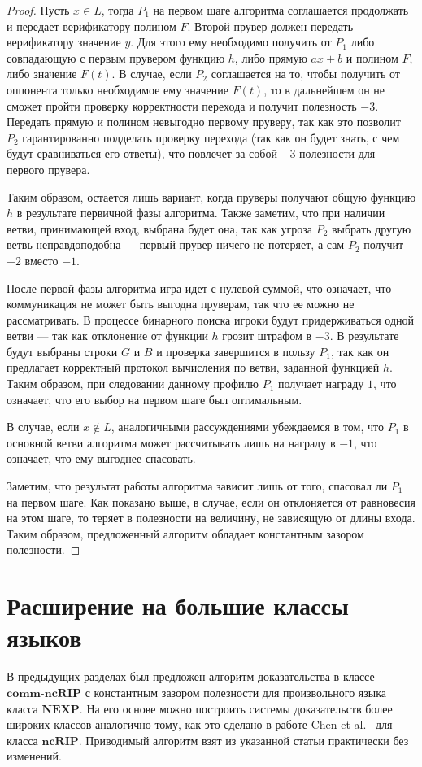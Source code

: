 \documentclass[14pt, a4paper]{extreport}
\begin{document}
\begin{proof}
        Пусть $x \in L$, тогда $P_1$ на первом шаге алгоритма соглашается продолжать и передает верификатору полином $F$. Второй прувер должен передать верификатору значение $y$. Для этого ему необходимо получить от $P_1$ либо совпадающую с первым прувером функцию $h$, либо прямую $a x + b$ и полином $F$, либо значение $F(t)$. В случае, если $P_2$ соглашается на то, чтобы получить от оппонента только необходимое ему значение $F(t)$, то в дальнейшем он не сможет пройти проверку корректности перехода и получит полезность $-3$. Передать прямую и полином невыгодно первому пруверу, так как это позволит $P_2$ гарантированно подделать проверку перехода (так как он будет знать, с чем будут сравниваться его ответы), что повлечет за собой $-3$ полезности для первого прувера.

        Таким образом, остается лишь вариант, когда пруверы получают общую функцию $h$ в результате первичной фазы алгоритма. Также заметим, что при наличии ветви, принимающей вход, выбрана будет она, так как угроза $P_2$ выбрать другую ветвь неправдоподобна --- первый прувер ничего не потеряет, а сам $P_2$ получит $-2$ вместо $-1$.

        После первой фазы алгоритма игра идет с нулевой суммой, что означает, что коммуникация не может быть выгодна пруверам, так что ее можно не рассматривать. В процессе бинарного поиска игроки будут придерживаться одной ветви --- так как отклонение от функции $h$ грозит штрафом в $-3$. В результате будут выбраны строки $G$ и $B$ и проверка завершится в пользу $P_1$, так как он предлагает корректный протокол вычисления по ветви, заданной функцией $h$. Таким образом, при следовании данному профилю $P_1$ получает награду $1$, что означает, что его выбор на первом шаге был оптимальным.

        В случае, если $x \notin L$, аналогичными рассуждениями убеждаемся в том, что $P_1$ в основной ветви алгоритма может рассчитывать лишь на награду в $-1$, что означает, что ему выгоднее спасовать.

        Заметим, что результат работы алгоритма зависит лишь от того, спасовал ли $P_1$ на первом шаге. Как показано выше, в случае, если он отклоняется от равновесия на этом шаге, то теряет в полезности на величину, не зависящую от длины входа. Таким образом, предложенный алгоритм обладает константным зазором полезности.
    \end{proof}
        \section{Расширение на большие классы языков}
        В предыдущих разделах был предложен алгоритм доказательства в классе $\textbf{comm-ncRIP}$ с константным зазором полезности для произвольного языка класса $\textbf{NEXP}$. На его основе можно построить системы доказательств более широких классов аналогично тому, как это сделано в работе Chen et al.~\cite{chen2017noncoop} для класса $\textbf{ncRIP}$. Приводимый алгоритм взят из указанной статьи практически без изменений.
\end{document}
